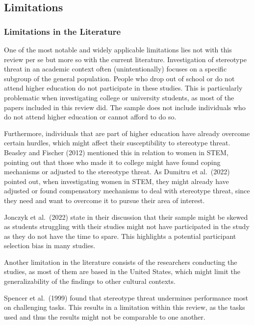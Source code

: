 \documentclass[
  stu, a4paper,floatsintext]{apa7}
\begin{document}
\subsection{Limitations}\label{limitations}

\subsubsection{Limitations in the Literature}\label{limitations-in-the-literature}

One of the most notable and widely applicable limitations lies not with this review per se but more so with the current literature. Investigation of stereotype threat in an academic context often (unintentionally) focuses on a specific subgroup of the general population. People who drop out of school or do not attend higher education do not participate in these studies. This is particularly problematic when investigating college or university students, as most of the papers included in this review did. The sample does not include individuals who do not attend higher education or cannot afford to do so.

Furthermore, individuals that are part of higher education have already overcome certain hurdles, which might affect their susceptibility to stereotype threat. Beasley and Fischer (2012) mentioned this in relation to women in STEM, pointing out that those who made it to college might have found coping mechanisms or adjusted to the stereotype threat. As Dumitru et al.~(2022) pointed out, when investigating women in STEM, they might already have adjusted or found compensatory mechanisms to deal with stereotype threat, since they need and want to overcome it to pursue their area of interest.

Jonczyk et al.~(2022) state in their discussion that their sample might be skewed as students struggling with their studies might not have participated in the study as they do not have the time to spare. This highlights a potential participant selection bias in many studies.

Another limitation in the literature consists of the researchers conducting the studies, as most of them are based in the United States, which might limit the generalizability of the findings to other cultural contexts.

Spencer et al.~(1999) found that stereotype threat undermines performance most on challenging tasks. This results in a limitation within this review, as the tasks used and thus the results might not be comparable to one another.
\end{document}

